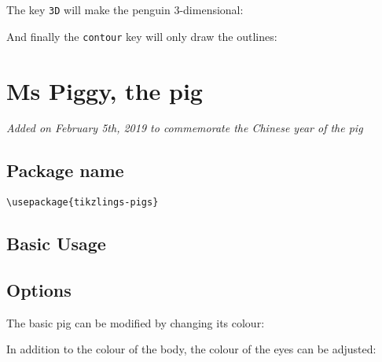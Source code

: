 \documentclass[parskip=half]{scrartcl}
\begin{document}
The key \lstinline|3D| will make the penguin 3-dimensional:
\begin{tcblisting}{}
\penguin[3D]
\end{tcblisting}

And finally the \lstinline|contour| key will only draw the outlines:
\begin{tcblisting}{}
\penguin[contour=black]
\end{tcblisting}

%
%
\clearpage
\section[Pig]{Ms Piggy, the pig}

\emph{Added on February 5th, 2019 to commemorate the Chinese year of the pig}

\subsection{Package name}

\begin{tcolorbox}[lower separated=false, lefthand width=.8\linewidth]
\vspace*{0.5cm}
\lstinline|\usepackage{tikzlings-pigs}| 
\vspace*{0.5cm}
\end{tcolorbox}

\subsection{Basic Usage}

\begin{tcblisting}{}
\pig
\end{tcblisting}

\subsection{Options}

The basic pig can be modified by changing its colour:
\begin{tcblisting}{}
\pig[body=blue]
\end{tcblisting}

In addition to the colour of the body, the colour of the eyes can be adjusted:
\begin{tcblisting}{}
\pig[eye=red]
\end{tcblisting}
\end{document}
